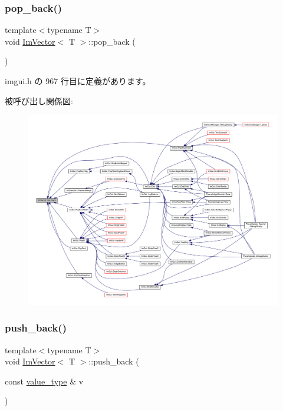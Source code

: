 \mbox{\label{class_im_vector_a3db7ce62d3c429effdb893fbf7148c1c}} 
\subsubsection{\texorpdfstring{pop\+\_\+back()}{pop\_back()}}
{\footnotesize\ttfamily template$<$typename T$>$ \\
void \mbox{\hyperlink{class_im_vector}{Im\+Vector}}$<$ T $>$\+::pop\+\_\+back (\begin{DoxyParamCaption}{ }\end{DoxyParamCaption})\hspace{0.3cm}{\ttfamily [inline]}}



 imgui.\+h の 967 行目に定義があります。

被呼び出し関係図\+:\nopagebreak
\begin{figure}[H]
\begin{center}
\leavevmode
\includegraphics[width=350pt]{class_im_vector_a3db7ce62d3c429effdb893fbf7148c1c_icgraph}
\end{center}
\end{figure}
\mbox{\label{class_im_vector_a68387993f2a5f5c3b2a7139d9ab778b8}} 
\subsubsection{\texorpdfstring{push\+\_\+back()}{push\_back()}}
{\footnotesize\ttfamily template$<$typename T$>$ \\
void \mbox{\hyperlink{class_im_vector}{Im\+Vector}}$<$ T $>$\+::push\+\_\+back (\begin{DoxyParamCaption}\item[{const \mbox{\hyperlink{class_im_vector_a8bd77e4e7581d8e5f9e98d7c2f3c2a80}{value\+\_\+type}} \&}]{v }\end{DoxyParamCaption})\hspace{0.3cm}{\ttfamily [inline]}}



